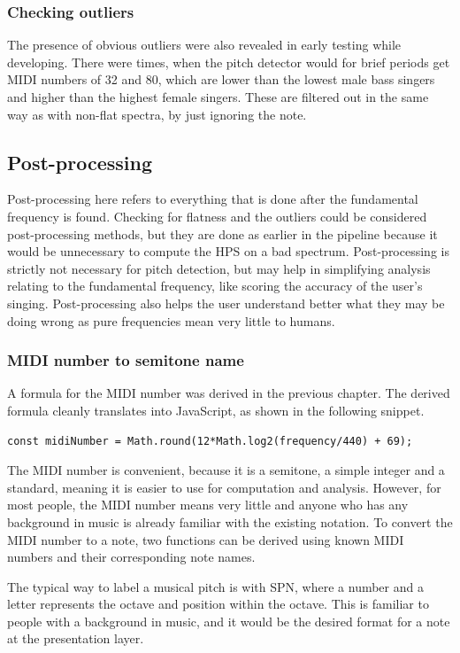 \subsubsection{Checking outliers}
The presence of obvious outliers were also revealed in early testing while developing. There were times, when the pitch detector would for brief periods get MIDI numbers of 32 and 80, which are lower than the lowest male bass singers and higher than the highest female singers. These are filtered out in the same way as with non-flat spectra, by just ignoring the note. 

\subsection{Post-processing}
Post-processing here refers to everything that is done after the fundamental frequency is found. Checking for flatness and the outliers could be considered post-processing methods, but they are done as earlier in the pipeline because it would be unnecessary to compute the HPS on a bad spectrum. Post-processing is strictly not necessary for pitch detection, but may help in simplifying analysis relating to the fundamental frequency, like scoring the accuracy of the user's singing. Post-processing also helps the user understand better what they may be doing wrong as pure frequencies mean very little to humans. 

\subsubsection{MIDI number to semitone name}
A formula for the MIDI number was derived in the previous chapter. The derived formula cleanly translates into JavaScript, as shown in the following snippet.

\begin{lstlisting}[style=javascript]
    const midiNumber = Math.round(12*Math.log2(frequency/440) + 69);
\end{lstlisting}

The MIDI number is convenient, because it is a semitone, a simple integer and a standard, meaning it is easier to use for computation and analysis. However, for most people, the MIDI number means very little and anyone who has any background in music is already familiar with the existing notation. To convert the MIDI number to a note, two functions can be derived using known MIDI numbers and their corresponding note names. 

The typical way to label a musical pitch is with SPN, where a number and a letter represents the octave and position within the octave. This is familiar to people with a background in music, and it would be the desired format for a note at the presentation layer.

